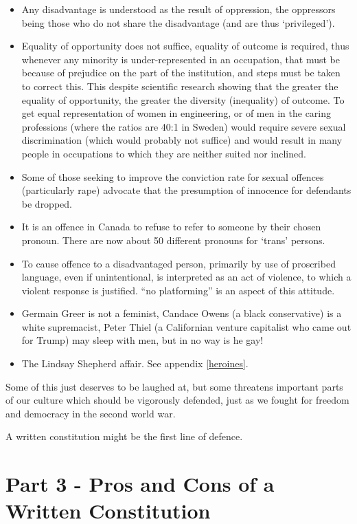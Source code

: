 \documentclass[14pt,titlepage]{extarticle}
\begin{document}
\begin{itemize}
\item Any disadvantage is understood as the result of oppression, the oppressors being those who do not share the disadvantage (and are thus `privileged').
\item Equality of opportunity does not suffice, equality of outcome is required, thus whenever any minority is under-represented in an occupation, that must be because of prejudice on the part of the institution, and steps must be taken to correct this.
  This despite scientific research showing that the greater the equality of opportunity, the greater the diversity (inequality) of outcome.
  To get equal representation of women in engineering, or of men in the caring professions (where the ratios are 40:1 in Sweden) would require severe sexual discrimination (which would probably not suffice) and would result in many people in occupations to which they are neither suited nor inclined.
\item Some of those seeking to improve the conviction rate for sexual offences (particularly rape) advocate that the presumption of innocence for defendants be dropped.
\item It is an offence in Canada to refuse to refer to someone by their chosen pronoun.
  There are now about 50 different pronouns for `trans' persons.
\item To cause offence to a disadvantaged person, primarily by use of proscribed language, even if unintentional, is interpreted as an act of violence, to which a violent response is justified.
  ``no platforming'' is an aspect of this attitude.
\item Germain Greer is not a feminist, Candace Owens (a black conservative) is a white supremacist, Peter Thiel (a Californian venture capitalist who came out for Trump) may sleep with men, but in no way is he gay!
  \item The Lindsay Shepherd affair.  See appendix \ref{heroines}.
  \end{itemize}

Some of this just deserves to be laughed at, but some threatens important parts of our culture which should be vigorously defended, just as we fought for freedom and democracy in the second world war.

A written constitution might be the first line of defence.

\section{Part 3 - Pros and Cons of a Written Constitution}\label{part3}
\end{document}
